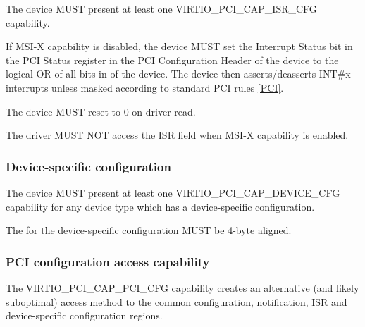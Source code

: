 The device MUST present at least one VIRTIO_PCI_CAP_ISR_CFG capability.  

If MSI-X capability is disabled, the device MUST set the Interrupt Status
bit in the PCI Status register in the PCI Configuration Header of
the device to the logical OR of all bits in  of
the device.  The device then asserts/deasserts INT\#x interrupts unless masked
according to standard PCI rules \hyperref[intro:PCI]{[PCI]}.

The device MUST reset  to 0 on driver read.


The driver MUST NOT access the ISR field when MSI-X capability
is enabled.

\subsubsection{Device-specific configuration}\label{sec:Virtio Transport Options / Virtio Over PCI Bus / PCI Device Layout / Device-specific configuration}

The device MUST present at least one VIRTIO_PCI_CAP_DEVICE_CFG capability for
any device type which has a device-specific configuration.


The  for the device-specific configuration MUST be 4-byte aligned.

\subsubsection{PCI configuration access capability}\label{sec:Virtio Transport Options / Virtio Over PCI Bus / PCI Device Layout / PCI configuration access capability}

The VIRTIO_PCI_CAP_PCI_CFG capability
creates an alternative (and likely suboptimal) access method to the
common configuration, notification, ISR and device-specific configuration regions.

